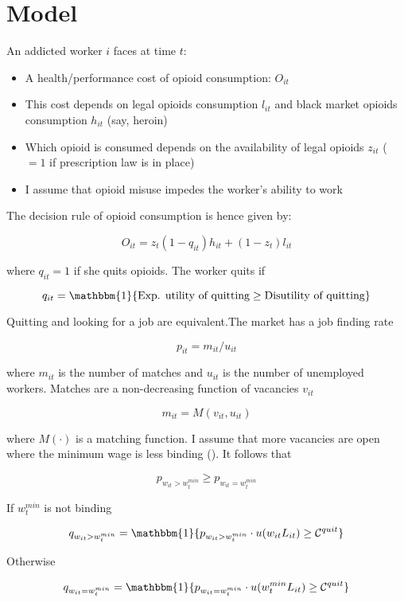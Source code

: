 \documentclass[12pt,a4paper]{article}
\begin{document}
\section*{Model}

An addicted worker \(i\) faces at time \(t\):

\begin{itemize}
    \item A health/performance cost of opioid consumption: \(O_{it}\)
    \item This cost depends on legal opioids consumption \(l_{it}\) and black market opioids consumption \(h_{it}\) (say, heroin)
    \item Which opioid is consumed depends on the availability of legal opioids \(z_{it}\) (\(= 1\) if prescription law is in place)
    \item I assume that opioid misuse impedes the worker's ability to work
\end{itemize}

The decision rule of opioid consumption is hence given by:

\[
    O_{it} = z_{t}\left(1-q_{it}\right)h_{it} + (1-z_{t})l_{it}
\]

where \(q_{it} = 1\) if she quits opioids. The worker quits if
        
\[
    q_{it} = \mathbbm{1}\{\text{Exp. utility of quitting} \geq \text{Disutility of quitting}\}
\]

Quitting and looking for a job are equivalent.The market has a job finding rate

\[
    p_{it} = m_{it}/u_{it} 
\]

where \(m_{it}\) is the number of matches and \(u_{it}\) is the number of unemployed workers. Matches are a non-decreasing function of vacancies \(v_{it}\)

\[
    m_{it} = M(v_{it}, u_{it})
\]

where \(M\left(\cdot \right) \) is a matching function. I assume that more vacancies are open where the minimum wage is less binding (\cite{flinn2010}). It follows that

\[
    p_{w_{it} > w^{min}_t} \geq p_{w_{it} = w^{min}_t}
\]

If \(w^{min}_t\) is not binding

\[
    q_{w_{it} > w^{min}_t} = \mathbbm{1}\{p_{w_{it} > w^{min}_t}\cdot u(w_{it}L_{it}) \geq \mathcal{C}^{quit}\}
\]

Otherwise

\[
    q_{w_{it} = w^{min}_t} = \mathbbm{1}\{p_{w_{it} = w^{min}_t}\cdot u(w^{min}_t L_{it}) \geq \mathcal{C}^{quit}\} 
\]
\end{document}

